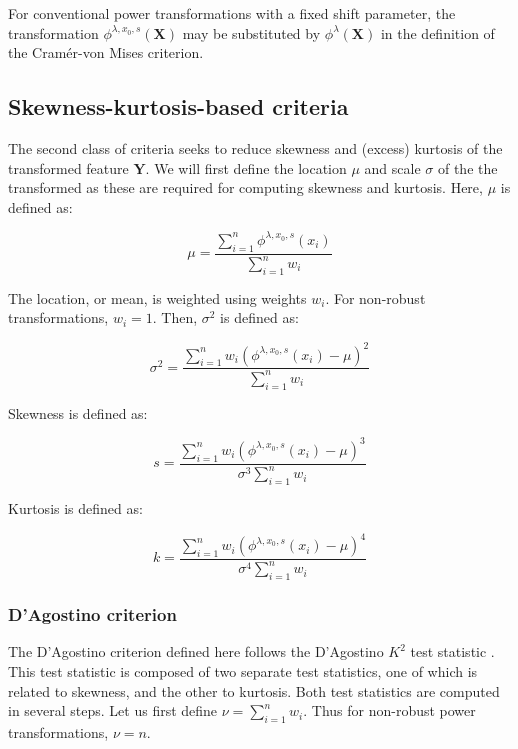 \documentclass[preprint,12pt,authoryear]{elsarticle}
\begin{document}
For conventional power transformations with a fixed shift parameter, the
transformation \(\phi^{\lambda, x_0, s} (\mathbf{X})\) may be
substituted by \(\phi^{\lambda} (\mathbf{X})\) in the definition of the
Cramér-von Mises criterion.

\subsection{Skewness-kurtosis-based
criteria}\label{skewness-kurtosis-based-criteria}

The second class of criteria seeks to reduce skewness and (excess)
kurtosis of the transformed feature \(\mathbf{Y}\). We will first define
the location \(\mu\) and scale \(\sigma\) of the the transformed as
these are required for computing skewness and kurtosis. Here, \(\mu\) is
defined as:

\begin{equation}
\mu = \frac{\sum_{i=1}^n \phi^{\lambda, x_0, s} \left(x_i \right)} {\sum_{i=1}^n w_i}
\end{equation}

The location, or mean, is weighted using weights \(w_i\). For non-robust
transformations, \(w_i = 1\). Then, \(\sigma^2\) is defined as:

\begin{equation}
\sigma^2 = \frac{\sum_{i=1}^n w_i \left(\phi^{\lambda, x_0, s} \left( x_i \right) - \mu \right)^2}{\sum_{i=1}^n w_i}
\end{equation}

Skewness is defined as:

\begin{equation}
s = \frac{\sum_{i=1}^n w_i \left(\phi^{\lambda, x_0, s} \left( x_i \right) - \mu \right)^3}{\sigma^3 \sum_{i=1}^n w_i}
\end{equation}

Kurtosis is defined as:

\begin{equation}
k = \frac{\sum_{i=1}^n w_i \left(\phi^{\lambda, x_0, s} \left( x_i \right) - \mu \right)^4}{\sigma^4 \sum_{i=1}^n w_i}
\end{equation}

\subsubsection{D'Agostino criterion}\label{dagostino-criterion}

The D'Agostino criterion defined here follows the D'Agostino \(K^2\)
test statistic \citep{DAgostino1990-kp}. This test statistic is
composed of two separate test statistics, one of which is related to
skewness, and the other to kurtosis. Both test statistics are computed
in several steps. Let us first define \(\nu=\sum_{i=1}^n w_i\). Thus for
non-robust power transformations, \(\nu = n\).
\end{document}
